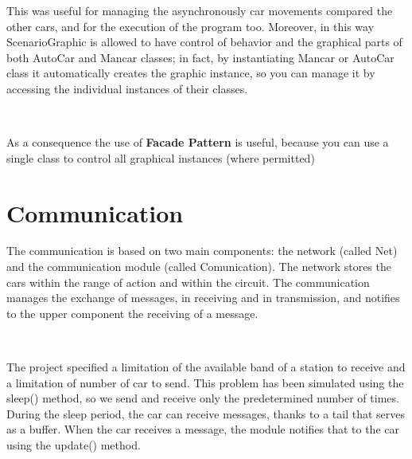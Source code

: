 \documentclass[a4paper,titlepage]{article}
\begin{document}
This was useful for managing the asynchronously car movements compared the other cars, and for the execution of the program too. Moreover, in this way ScenarioGraphic is allowed to have control of behavior and the graphical parts of both AutoCar and Mancar classes; in fact, by instantiating Mancar or AutoCar class it automatically creates the graphic instance, so you can manage it by accessing the individual instances of their classes.

~

As a consequence the use of \textbf{Facade Pattern} is useful, because you can use a single class to control all graphical instances (where permitted)

\newpage

\part{Communication}

The communication is based on two main components: the network (called Net) and the communication module (called Comunication). The network stores the cars within the range of action and within the circuit. The communication manages the exchange of messages, in receiving and in transmission, and notifies to the upper component the receiving of a message.

~

The project specified a limitation of the available band of a station to receive and a limitation of number of car to send. This problem has been simulated using the sleep() method, so we send and receive only the predetermined number of times.
During the sleep period, the car can receive messages, thanks to a tail that serves as a buffer. When the car receives a message, the module
notifies that to the car using the update() method.

~
\end{document}
